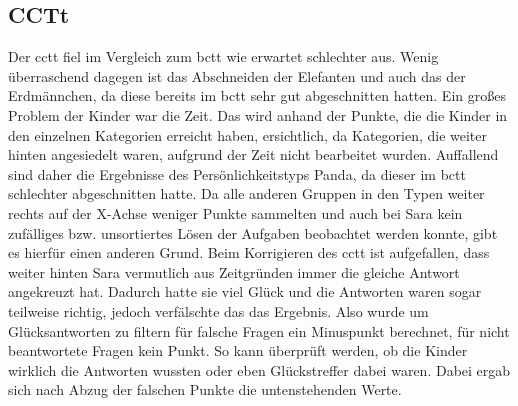 	\subsection{CCTt}
	Der \acrshort{cctt} fiel im Vergleich zum \acrshort{bctt} wie erwartet schlechter aus. Wenig überraschend dagegen ist das Abschneiden der Elefanten und auch das der Erdmännchen, da diese bereits im \acrshort{bctt} sehr gut abgeschnitten hatten. Ein großes Problem der Kinder war die Zeit. Das wird anhand der Punkte, die die Kinder in den einzelnen Kategorien erreicht haben, ersichtlich, da Kategorien, die weiter hinten angesiedelt waren, aufgrund der Zeit nicht bearbeitet wurden. Auffallend sind daher die Ergebnisse des Persönlichkeitstyps Panda, da dieser im \acrshort{bctt} schlechter abgeschnitten hatte. Da alle anderen Gruppen in den Typen weiter rechts auf der X-Achse weniger Punkte sammelten und auch bei Sara kein zufälliges bzw. unsortiertes Lösen der Aufgaben beobachtet werden konnte, gibt es hierfür einen anderen Grund. Beim Korrigieren des \acrshort{cctt} ist aufgefallen, dass weiter hinten Sara vermutlich aus Zeitgründen immer die gleiche Antwort angekreuzt hat. Dadurch hatte sie viel Glück und die Antworten waren sogar teilweise richtig, jedoch verfälschte das das Ergebnis. Also wurde um Glücksantworten zu filtern für falsche Fragen ein Minuspunkt berechnet, für nicht beantwortete Fragen kein Punkt. So kann überprüft werden, ob die Kinder wirklich die Antworten wussten oder eben Glückstreffer dabei waren. Dabei ergab sich nach Abzug der falschen Punkte die untenstehenden Werte.
	
	
	\mydata


